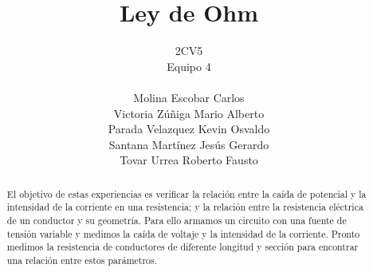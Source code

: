 \documentclass[11pt]{article}
\title{Ley de Ohm}
\author{2CV5\\Equipo 4\\\\Molina Escobar Carlos\\Victoria Zúñiga Mario Alberto\\Parada Velazquez Kevin Osvaldo\\Santana Martínez Jesús Gerardo\\Tovar Urrea Roberto Fausto}
\date{}
\begin{document}
	
\maketitle

\begin{abstract}

	El objetivo de estas experiencias es verificar la relación entre la caída de potencial y la intensidad de la corriente en una resistencia; y la relación entre la resistencia eléctrica de un conductor y su geometría. Para ello armamos un circuito con una fuente de tensión variable y medimos la caída de voltaje y la intensidad de la corriente. Pronto medimos la resistencia de conductores de diferente longitud y sección para encontrar una relación entre estos parámetros.

\end{abstract}
\end{document}
